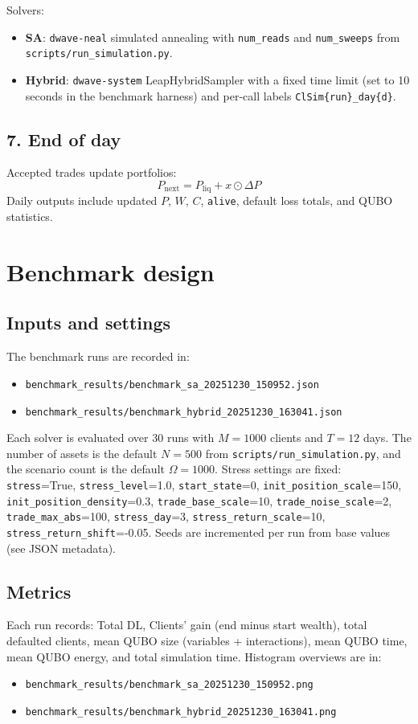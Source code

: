 \documentclass[11pt]{article}
\begin{document}
Solvers:
\begin{itemize}[leftmargin=*]
  \item \textbf{SA}: \texttt{dwave-neal} simulated annealing with
  \texttt{num\_reads} and \texttt{num\_sweeps} from \texttt{scripts/run\_simulation.py}.
  \item \textbf{Hybrid}: \texttt{dwave-system} LeapHybridSampler with a fixed
  time limit (set to 10 seconds in the benchmark harness) and per-call labels
  \texttt{ClSim\{run\}\_day\{d\}}.
\end{itemize}

\subsection{7. End of day}
Accepted trades update portfolios:
\[
P_{\text{next}} = P_{\text{liq}} + x \odot \Delta P
\]
Daily outputs include updated $P$, $W$, $C$, \texttt{alive}, default loss totals,
and QUBO statistics.

\section{Benchmark design}
\subsection{Inputs and settings}
The benchmark runs are recorded in:
\begin{itemize}[leftmargin=*]
  \item \texttt{benchmark\_results/benchmark\_sa\_20251230\_150952.json}
  \item \texttt{benchmark\_results/benchmark\_hybrid\_20251230\_163041.json}
\end{itemize}
Each solver is evaluated over 30 runs with $M=1000$ clients and $T=12$ days. The
number of assets is the default $N=500$ from \texttt{scripts/run\_simulation.py},
and the scenario count is the default $\Omega=1000$. Stress settings are fixed:
\texttt{stress}=True, \texttt{stress\_level}=1.0, \texttt{start\_state}=0,
\texttt{init\_position\_scale}=150, \texttt{init\_position\_density}=0.3,
\texttt{trade\_base\_scale}=10, \texttt{trade\_noise\_scale}=2,
\texttt{trade\_max\_abs}=100, \texttt{stress\_day}=3,
\texttt{stress\_return\_scale}=10, \texttt{stress\_return\_shift}=-0.05.
Seeds are incremented per run from base values (see JSON metadata).

\subsection{Metrics}
Each run records:
Total DL, Clients' gain (end minus start wealth), total defaulted clients,
mean QUBO size (variables + interactions), mean QUBO time, mean QUBO energy, and
total simulation time. Histogram overviews are in:
\begin{itemize}[leftmargin=*]
  \item \texttt{benchmark\_results/benchmark\_sa\_20251230\_150952.png}
  \item \texttt{benchmark\_results/benchmark\_hybrid\_20251230\_163041.png}
\end{itemize}
\end{document}
